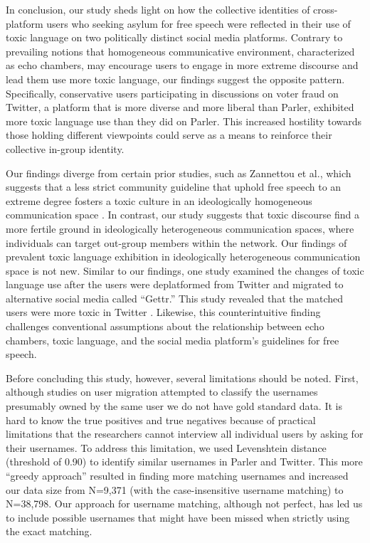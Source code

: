 \documentclass[Crown,sagev,times]{sagej}
\begin{document}
In conclusion, our study sheds light on how the collective identities of cross-platform users who seeking asylum 
for free speech were reflected in their use of toxic language on two politically distinct social media platforms. 
Contrary to prevailing notions that homogeneous communicative environment, characterized as echo chambers, 
may encourage users to engage in more extreme discourse and lead them use more toxic language, our findings suggest 
the opposite pattern.
Specifically, conservative users participating in discussions on voter fraud on Twitter, a platform that is 
more diverse and more liberal than Parler, exhibited more toxic language use than they did on Parler. 
This increased hostility towards those holding different viewpoints could serve as a means to reinforce their 
collective in-group identity. 

Our findings diverge from certain prior studies, such as Zannettou et al., 
which suggests that a less strict community guideline that uphold free speech to an extreme degree fosters 
a toxic culture in an ideologically homogeneous communication space \cite{zannettou2018gab}. In contrast, our study suggests that toxic discourse find a more fertile ground in ideologically heterogeneous communication spaces, 
where individuals can target out-group members within the network. Our findings of prevalent toxic language exhibition 
in ideologically heterogeneous communication space is not new. Similar to our findings, one study examined the changes 
of toxic language use after the users were deplatformed from Twitter and migrated to alternative social media called ``Gettr.''
This study revealed that the matched users were more toxic in Twitter \cite{meakacher2023}. 
Likewise, this counterintuitive finding challenges conventional assumptions about the relationship between echo chambers, 
toxic language, and the social media platform's guidelines for free speech. 

Before concluding this study, however, several limitations should be noted. 
First, although studies on user migration attempted to classify the usernames presumably owned by 
the same user \cite{kumar2011understanding} we do not have gold standard data. 
It is hard to know the true positives and true negatives because of practical limitations that the researchers 
cannot interview all individual users by asking for their usernames. 
To address this limitation, we used Levenshtein distance (threshold of 0.90) \cite{levenshtein1966binary} 
to identify similar usernames in Parler and Twitter. This more ``greedy approach'' resulted in finding more 
matching usernames and increased our data size from N=9,371 (with the case-insensitive username matching) 
to N=38,798. Our approach for username matching, although not perfect, has led us to include possible usernames 
that might have been missed when strictly using the exact matching.
\end{document}
